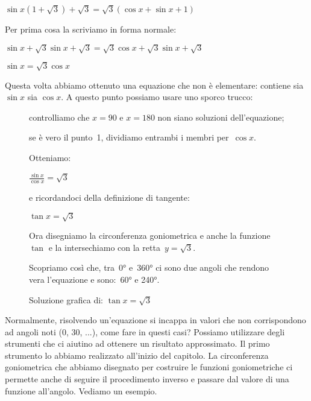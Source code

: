  \begin{esempio}
  $\sin x (1 + \sqrt{3}) + \sqrt{3} = \sqrt{3}(\cos x + \sin x +1)$
  
  Per prima cosa la scriviamo in forma normale:
  
  $\sin x + \sqrt{3} \sin x + \sqrt{3} = 
   \sqrt{3} \cos x + \sqrt{3} \sin x + \sqrt{3}$
   
  $\sin x  = \sqrt{3} \cos x $
  
 Questa volta abbiamo ottenuto una equazione che non è elementare: 
  contiene sia $\sin x$ sia $\cos x$.
  A questo punto possiamo usare uno sporco trucco:
  
 \begin{figure}[!h]
 \begin{minipage}{.50\textwidth}
  \begin{center}
\begin{inaccessibleblock}[Soluzione grafica dell'equazione: 
    $\tan x = \sqrt{3}$.]
    
    \caption{Soluzione grafica di: $\tan x = \sqrt{3}$}
    \label{fig:trigo_equazione03}
\end{inaccessibleblock}
  \end{center}
 \end{minipage}
 \begin{minipage}{.48\textwidth}
  \begin{enumerate*}
   \item controlliamo che $x = 90$ e $x = 180$ non siano soluzioni 
    dell'equazione;
   \item se è vero il punto~1, dividiamo entrambi i membri per~$\cos x$.
  \end{enumerate*}
  Otteniamo:

  $\frac{\sin x}{\cos x} = \sqrt{3}$
  
  e ricordandoci della definizione di tangente:

  $\tan x = \sqrt{3}$
  
  Ora disegniamo la circonferenza goniometrica e anche la funzione~$\tan$ 
  e la intersechiamo con la retta~$y=\sqrt{3}$.
  
  Scopriamo così che, tra~0° e~360° ci sono due angoli che rendono vera 
  l'equazione e sono:~60° e 240°. 
 \end{minipage}
\end{figure}
 \end{esempio}


 Normalmente, risolvendo un'equazione si incappa in valori che non 
 corrispondono ad angoli noti (0\grado, 30\grado, ...), come fare in questi 
 casi? Possiamo utilizzare degli strumenti che ci aiutino ad ottenere un 
 risultato approssimato. Il primo strumento lo abbiamo realizzato all'inizio 
 del capitolo. La circonferenza goniometrica che abbiamo disegnato per 
 costruire le funzioni goniometriche ci permette anche di seguire il 
 procedimento inverso e passare dal valore di una funzione all'angolo. 
 Vediamo un esempio.
 
